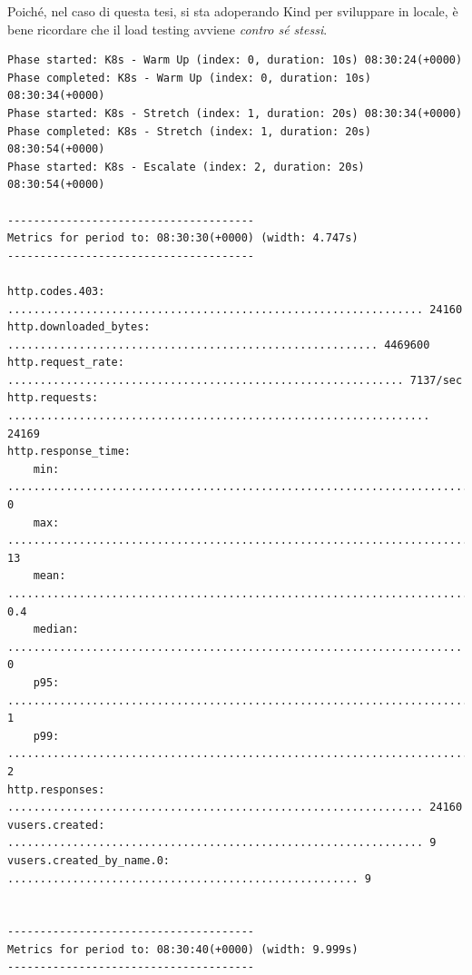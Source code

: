 Poiché, nel caso di questa tesi, si sta adoperando Kind per sviluppare in locale, è bene ricordare che il load testing avviene {\em contro sé stessi}.

\begin{code}
\label{code:apx:a:yaml}
\begin{verbatim}
Phase started: K8s - Warm Up (index: 0, duration: 10s) 08:30:24(+0000)
Phase completed: K8s - Warm Up (index: 0, duration: 10s) 08:30:34(+0000)
Phase started: K8s - Stretch (index: 1, duration: 20s) 08:30:34(+0000)
Phase completed: K8s - Stretch (index: 1, duration: 20s) 08:30:54(+0000)
Phase started: K8s - Escalate (index: 2, duration: 20s) 08:30:54(+0000)

--------------------------------------
Metrics for period to: 08:30:30(+0000) (width: 4.747s)
--------------------------------------

http.codes.403: ................................................................ 24160
http.downloaded_bytes: ......................................................... 4469600
http.request_rate: ............................................................. 7137/sec
http.requests: ................................................................. 24169
http.response_time:
    min: ......................................................................... 0
    max: ......................................................................... 13
    mean: ........................................................................ 0.4
    median: ...................................................................... 0
    p95: ......................................................................... 1
    p99: ......................................................................... 2
http.responses: ................................................................ 24160
vusers.created: ................................................................ 9
vusers.created_by_name.0: ...................................................... 9


--------------------------------------
Metrics for period to: 08:30:40(+0000) (width: 9.999s)
--------------------------------------


\end{verbatim}
\end{code}
